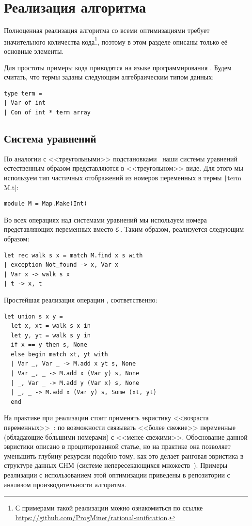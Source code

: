 \section{Реализация алгоритма}

Полноценная реализация алгоритма со всеми оптимизациями требует значительного количества кода\footnote{С примерами такой реализации можно ознакомиться по ссылке \url{https://github.com/ProgMiner/rational-unification}.}, поэтому в этом разделе описаны только её основные элементы.

Для простоты примеры кода приводятся на языке программирования \OCaml. Будем считать, что термы заданы следующим алгебраическим типом данных:

\begin{verbatim}
type term =
| Var of int
| Con of int * term array
\end{verbatim}


\subsection{Система уравнений}

По аналогии с <<треугольными>> подстановками~\cite{baader2001unification} наши системы уравнений естественным образом представляются в <<треугольном>> виде. Для этого мы используем тип частичных отображений из номеров переменных в термы \texttt|term M.t|:
\begin{verbatim}
module M = Map.Make(Int)
\end{verbatim}

Во всех операциях над системами уравнений мы используем номера представляющих переменных вместо $\mathcal{E}$. Таким образом, \walk реализуется следующим образом:
\begin{verbatim}
let rec walk s x = match M.find x s with
| exception Not_found -> x, Var x
| Var x -> walk s x
| t -> x, t
\end{verbatim}

Простейшая реализация операции \union, соответственно:
\begin{verbatim}
let union s x y =
  let x, xt = walk s x in
  let y, yt = walk s y in
  if x == y then s, None
  else begin match xt, yt with
  | Var _, Var _ -> M.add x yt s, None
  | Var _, _ -> M.add x (Var y) s, None
  | _, Var _ -> M.add y (Var x) s, None
  | _, _ -> M.add x (Var y) s, Some (xt, yt)
  end
\end{verbatim}

На практике при реализации \union стоит применять эвристику <<возраста переменных>>~\cite{mannila1986complexity}: по возможности связывать <<более свежие>> переменные (обладающие б\'{о}льшими номерами) с <<менее свежими>>. Обоснование данной эвристики описано в процитированной статье, но на практике она позволяет уменьшить глубину рекурсии \walk подобно тому, как это делает ранговая эвристика в структуре данных СНМ (системе непересекающихся множеств~\cite{galler1964improved}). Примеры реализации с использованием этой оптимизации приведены в репозитории с анализом производительности алгоритма.


